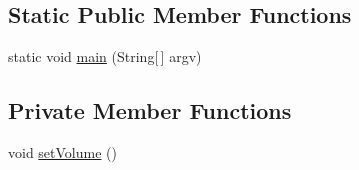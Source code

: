 \subsection*{Static Public Member Functions}
\begin{DoxyCompactItemize}
\item 
static void \mbox{\hyperlink{classorg_1_1newdawn_1_1slick_1_1tests_1_1_sound_test_a9bdeb4f80c07bd010efd98dad6018306}{main}} (String\mbox{[}$\,$\mbox{]} argv)
\end{DoxyCompactItemize}
\subsection*{Private Member Functions}
\begin{DoxyCompactItemize}
\item 
void \mbox{\hyperlink{classorg_1_1newdawn_1_1slick_1_1tests_1_1_sound_test_a818b151785f73f691dc4b1a8ed5895bb}{set\+Volume}} ()
\end{DoxyCompactItemize}
